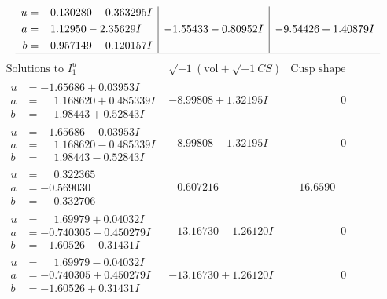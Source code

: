 \documentclass[1p]{elsarticle_modified}
\theoremstyle{definition}
\newcommand{\I}{\sqrt{-1}}
\begin{document}
$$\begin{array}{c|c|c}
\begin{aligned}
u &= -0.130280 - 0.363295 I \\
a &= \phantom{-}1.12950 - 2.35629 I \\
b &= \phantom{-}0.957149 - 0.120157 I\end{aligned}
 & -1.55433 - 0.80952 I & -9.54426 + 1.40879 I\\
 \hline 
 \end{array}$$\newpage$$\begin{array}{c|c|c}  
\text{Solutions to }I^u_{1}& \I (\text{vol} + \sqrt{-1}CS) & \text{Cusp shape}\\
 \hline 
\begin{aligned}
u &= -1.65686 + 0.03953 I \\
a &= \phantom{-}1.168620 + 0.485339 I \\
b &= \phantom{-}1.98443 + 0.52843 I\end{aligned}
 & -8.99808 + 1.32195 I & \phantom{-0.000000 } 0 \\ \hline\begin{aligned}
u &= -1.65686 - 0.03953 I \\
a &= \phantom{-}1.168620 - 0.485339 I \\
b &= \phantom{-}1.98443 - 0.52843 I\end{aligned}
 & -8.99808 - 1.32195 I & \phantom{-0.000000 } 0 \\ \hline\begin{aligned}
u &= \phantom{-}0.322365\phantom{ +0.000000I} \\
a &= -0.569030\phantom{ +0.000000I} \\
b &= \phantom{-}0.332706\phantom{ +0.000000I}\end{aligned}
 & -0.607216\phantom{ +0.000000I} & -16.6590\phantom{ +0.000000I} \\ \hline\begin{aligned}
u &= \phantom{-}1.69979 + 0.04032 I \\
a &= -0.740305 - 0.450279 I \\
b &= -1.60526 - 0.31431 I\end{aligned}
 & -13.16730 - 1.26120 I & \phantom{-0.000000 } 0 \\ \hline\begin{aligned}
u &= \phantom{-}1.69979 - 0.04032 I \\
a &= -0.740305 + 0.450279 I \\
b &= -1.60526 + 0.31431 I\end{aligned}
 & -13.16730 + 1.26120 I & \phantom{-0.000000 } 0 \\ \hline\begin{aligned}

\end{aligned}
\end{array}$$
\end{document}
